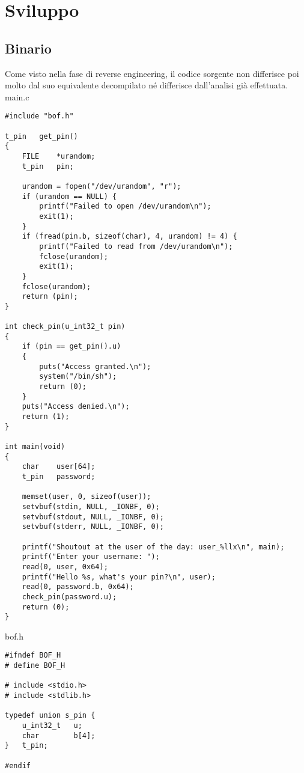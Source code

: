 \documentclass[main.tex]{subfiles}
\begin{document}
\section{Sviluppo}\label{sec:sviluppo}

\subsection{Binario}
Come visto nella fase di reverse engineering, il codice sorgente non differisce poi molto dal suo equivalente decompilato né differisce dall'analisi già effettuata.\\

main.c
\begin{lstlisting}[style=CStyle]
#include "bof.h"

t_pin	get_pin()
{
    FILE	*urandom;
    t_pin	pin;

    urandom = fopen("/dev/urandom", "r");
    if (urandom == NULL) {
        printf("Failed to open /dev/urandom\n");
        exit(1);
    }
    if (fread(pin.b, sizeof(char), 4, urandom) != 4) {
        printf("Failed to read from /dev/urandom\n");
        fclose(urandom);
        exit(1);
    }
    fclose(urandom);
    return (pin);
}

int	check_pin(u_int32_t pin)
{
    if (pin == get_pin().u)
    {
        puts("Access granted.\n");
        system("/bin/sh");
        return (0);
    }
    puts("Access denied.\n");
    return (1);
}

int	main(void)
{
    char	user[64];
    t_pin	password;

    memset(user, 0, sizeof(user));
    setvbuf(stdin, NULL, _IONBF, 0);
    setvbuf(stdout, NULL, _IONBF, 0);
    setvbuf(stderr, NULL, _IONBF, 0);

    printf("Shoutout at the user of the day: user_%llx\n", main);
    printf("Enter your username: ");
    read(0, user, 0x64);
    printf("Hello %s, what's your pin?\n", user);
    read(0, password.b, 0x64);
    check_pin(password.u);
    return (0);
}
\end{lstlisting}

bof.h
\begin{lstlisting}[style=CStyle]
#ifndef BOF_H
# define BOF_H

# include <stdio.h>
# include <stdlib.h>

typedef union s_pin {
    u_int32_t   u;
    char        b[4];
}	t_pin;

#endif
\end{lstlisting}
\end{document}
